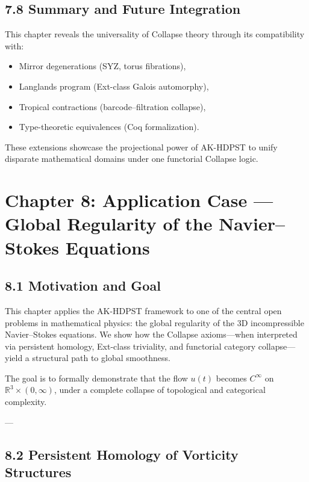 \documentclass[11pt]{article}
\begin{document}
\subsection*{7.8 Summary and Future Integration}

This chapter reveals the universality of Collapse theory through its compatibility with:
\begin{itemize}
  \item Mirror degenerations (SYZ, torus fibrations),
  \item Langlands program (Ext-class Galois automorphy),
  \item Tropical contractions (barcode–filtration collapse),
  \item Type-theoretic equivalences (Coq formalization).
\end{itemize}

These extensions showcase the projectional power of AK-HDPST to unify disparate mathematical domains under one functorial Collapse logic.



\section*{Chapter 8: Application Case — Global Regularity of the Navier–Stokes Equations}

\subsection*{8.1 Motivation and Goal}

This chapter applies the AK-HDPST framework to one of the central open problems in mathematical physics:  
the global regularity of the 3D incompressible Navier–Stokes equations.  
We show how the Collapse axioms—when interpreted via persistent homology, Ext-class triviality,  
and functorial category collapse—yield a structural path to global smoothness.

The goal is to formally demonstrate that the flow \( u(t) \) becomes \( C^\infty \) on \( \mathbb{R}^3 \times (0,\infty) \),  
under a complete collapse of topological and categorical complexity.

---

\subsection*{8.2 Persistent Homology of Vorticity Structures}
\end{document}
